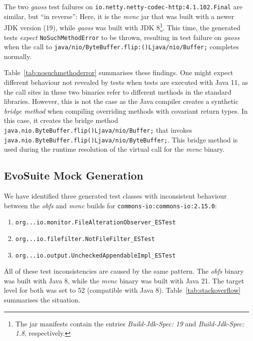 \documentclass[conference]{IEEEtran}
\newcommand{\tim}[1]{\textbf{\textcolor{violet}{[ \ding{46}Tim: #1]}}}
\begin{document}
The two \textit{gaoss} test failures on \texttt{io.netty.netty-\-codec-http:4.1.102.Final} are similar, but ``in reverse'': Here, it is the \textit{mvnc} jar that was built with a newer JDK version (19), while \textit{gaoss} was built with JDK 8\footnote{The jar manifests contain the entries \textit{Build-Jdk-Spec: 19} and \textit{Build-Jdk-Spec: 1.8}, respectively.}.
This time, the generated tests \textit{expect} \texttt{NoSuchMethodError} to be thrown, resulting in test failure on \textit{gaoss} when the call to \texttt{java/nio/ByteBuffer.flip:()Ljava/nio/Buffer;} completes normally.%

Table~\ref{tab:nosuchmethoderror} summarises these findings. One might expect different behaviour not revealed by tests when tests are executed with Java 11, as the call sites in these two binaries refer to different methods in the standard libraries. However, this is not the case as the Java compiler creates a synthetic \textit{bridge method} when compiling overriding methods with covariant return types. In this case, it creates the bridge method \texttt{java.nio.ByteBuffer.flip()Ljava/nio/Buffer;}  that invokes \texttt{java.nio.ByteBuffer.flip()Ljava/nio/ByteBuffer;}. This bridge method is used during the  runtime resolution of the virtual call for the \textit{mvnc} binary.


\subsection{EvoSuite Mock Generation}


We have identified three generated test classes with inconsistent behaviour between the \textit{obfs} and \textit{mvnc} builds for \texttt{commons-io:commons-io:2.15.0}: 
\begin{enumerate}
	\item  \texttt{org...io.monitor.FileAlterationObserver\_ESTest}
    \item \texttt{org...io.filefilter.NotFileFilter\_ESTest}
    \item  \texttt{org...io.output.UncheckedAppendableImpl\_ESTest}
\end{enumerate}

All of these test inconsistencies are caused by the same pattern.  The \textit{obfs} binary was built  with Java 8, while the \textit{mvnc} binary was built with Java 21. The target level for both was set to 52 (compatible with Java 8). Table~\ref{tab:stackoverflow} summarises the situation.
\end{document}
